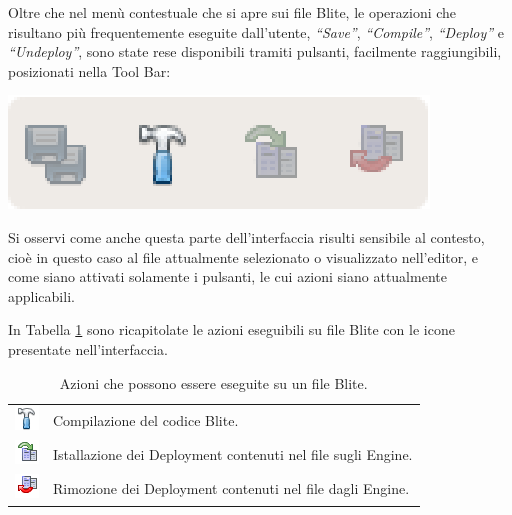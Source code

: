 Oltre che nel menù contestuale che si apre sui file Blite, le operazioni che
risultano più frequentemente eseguite dall'utente, \emph{``Save''},
\emph{``Compile''}, \emph{``Deploy''} e \emph{``Undeploy''}, sono state rese
disponibili tramiti pulsanti, facilmente raggiungibili, posizionati nella Tool
Bar:

\begin{center}
\includegraphics[scale=0.70]
{blide/dia/BlideFileToolBar}
\end{center}

Si osservi come anche questa parte dell'interfaccia risulti sensibile al
contesto, cioè in questo caso al file attualmente selezionato o visualizzato
nell'editor, e come siano attivati solamente i pulsanti, le cui azioni siano
attualmente applicabili. 

In Tabella \ref{tab:blideactions} sono ricapitolate le azioni eseguibili su file Blite con le
icone presentate nell'interfaccia.

\begin{table}
\begin{center}
\begin{tabular}{c p{} }
\includegraphics[scale=0.8]{blide/dia/build24} & Compilazione del codice
Blite.\\ 
\includegraphics[scale=0.8]{blide/dia/deploy24} & Istallazione dei Deployment
contenuti nel file sugli Engine.\\
\includegraphics[scale=0.8]{blide/dia/undeploy24} & Rimozione dei Deployment
contenuti nel file dagli Engine.
\end{tabular}

\caption[Azioni che possono essere eseguite su un file Blite]{Azioni che
possono essere eseguite su un file Blite.}
\label{tab:blideactions}
\end{center}
\end{table}


